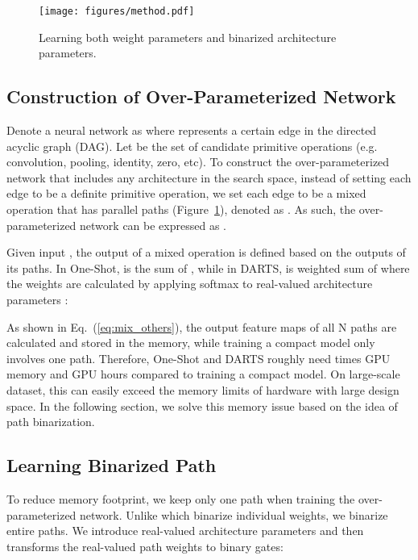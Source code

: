 \documentclass{article} \usepackage{iclr2019_conference,times}
\begin{document}
\begin{figure}[t]
    \vspace{-10pt}
	\centering
	\texttt{[image: figures/method.pdf]}
\caption{Learning both weight parameters and binarized architecture parameters.}
	\label{fig:method}
\end{figure}

\subsection{Construction of Over-Parameterized Network}\label{sec:over-parameterized}
Denote a neural network as  where  represents a certain edge in the directed acyclic graph (DAG). Let  be the set of  candidate primitive operations (e.g. convolution, pooling, identity, zero, etc). To construct the over-parameterized network that includes any architecture in the search space, instead of setting each edge to be a definite primitive operation, we set each edge to be a mixed operation that has  parallel paths (Figure~\ref{fig:method}), denoted as . As such, the over-parameterized network can be expressed as . 

Given input , the output of a mixed operation  is defined based on the outputs of its  paths. In One-Shot,  is the sum of , while in DARTS,  is weighted sum of  where the weights are calculated by applying softmax to  real-valued architecture parameters :

As shown in Eq.~(\ref{eq:mix_others}), the output feature maps of all N paths are calculated and stored in the memory, while training a compact model only involves one path. Therefore, One-Shot and DARTS roughly need  times GPU memory and GPU hours compared to training a compact model. On large-scale dataset, this can easily exceed the memory limits of hardware with large design space. In the following section, we solve this memory issue based on the idea of path binarization.

\subsection{Learning Binarized Path}
\label{sec:binarized_path_learning}
To reduce memory footprint, we keep only one path when training the over-parameterized network. Unlike \citet{courbariaux2015binaryconnect} which binarize individual weights, we binarize entire paths. We introduce  real-valued architecture parameters  and then transforms the real-valued path weights to binary gates: 
\end{document}
